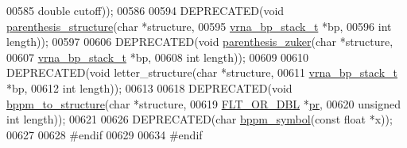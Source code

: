 \begin{DoxyCode}
00585                                       \textcolor{keywordtype}{double}      cutoff));
00586 
00594 DEPRECATED(\textcolor{keywordtype}{void} \hyperlink{group__struct__utils_gadf0ad2d46c9ca7b850437d1b79627a7e}{parenthesis\_structure}(\textcolor{keywordtype}{char}            *structure,
00595                                       \hyperlink{group__data__structures_structvrna__bp__stack__s}{vrna\_bp\_stack\_t} *bp,
00596                                       \textcolor{keywordtype}{int}             length));
00597 
00606 DEPRECATED(\textcolor{keywordtype}{void} \hyperlink{group__struct__utils_gab9c5c8311bd5120900585d4fa50c2df0}{parenthesis\_zuker}(\textcolor{keywordtype}{char}            *structure,
00607                                   \hyperlink{group__data__structures_structvrna__bp__stack__s}{vrna\_bp\_stack\_t} *bp,
00608                                   \textcolor{keywordtype}{int}             length));
00609 
00610 DEPRECATED(\textcolor{keywordtype}{void} letter\_structure(\textcolor{keywordtype}{char}             *structure,
00611                                  \hyperlink{group__data__structures_structvrna__bp__stack__s}{vrna\_bp\_stack\_t}  *bp,
00612                                  \textcolor{keywordtype}{int}              length));
00613 
00618 DEPRECATED(\textcolor{keywordtype}{void}  \hyperlink{group__struct__utils_ga129d81c4a1ead793c5b2311333e03dfa}{bppm\_to\_structure}(\textcolor{keywordtype}{char}         *structure,
00619                                    \hyperlink{group__data__structures_ga31125aeace516926bf7f251f759b6126}{FLT\_OR\_DBL}   *\hyperlink{fold__vars_8h_ac98ec419070aee6831b44e5c700f090f}{pr},
00620                                    \textcolor{keywordtype}{unsigned} \textcolor{keywordtype}{int} length));
00621 
00626 DEPRECATED(\textcolor{keywordtype}{char}    \hyperlink{group__struct__utils_ga49962ad6242b8c628de6ca16bb831c1d}{bppm\_symbol}(\textcolor{keyword}{const} \textcolor{keywordtype}{float} *x));
00627 
00628 \textcolor{preprocessor}{#endif}
00629 
00634 \textcolor{preprocessor}{#endif}
\end{DoxyCode}
